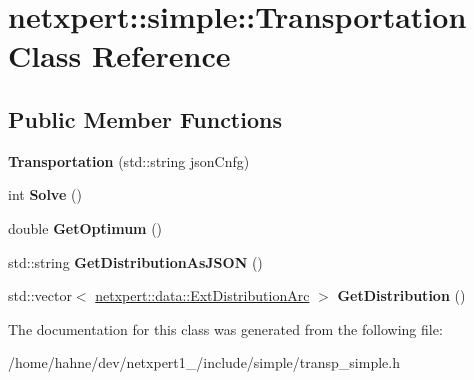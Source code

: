 \hypertarget{classnetxpert_1_1simple_1_1Transportation}{}\section{netxpert\+:\+:simple\+:\+:Transportation Class Reference}
\label{classnetxpert_1_1simple_1_1Transportation}
\subsection*{Public Member Functions}
\begin{DoxyCompactItemize}
\item 
{\bfseries Transportation} (std\+::string json\+Cnfg)\hypertarget{classnetxpert_1_1simple_1_1Transportation_ad20d4fb083bca27030f954e7d38d90b6}{}\label{classnetxpert_1_1simple_1_1Transportation_ad20d4fb083bca27030f954e7d38d90b6}

\item 
int {\bfseries Solve} ()\hypertarget{classnetxpert_1_1simple_1_1Transportation_a6483918f2f94c48cf3157fdcf8656f0a}{}\label{classnetxpert_1_1simple_1_1Transportation_a6483918f2f94c48cf3157fdcf8656f0a}

\item 
double {\bfseries Get\+Optimum} ()\hypertarget{classnetxpert_1_1simple_1_1Transportation_a26f54056cff8ffdc19caa832354cde82}{}\label{classnetxpert_1_1simple_1_1Transportation_a26f54056cff8ffdc19caa832354cde82}

\item 
std\+::string {\bfseries Get\+Distribution\+As\+J\+S\+ON} ()\hypertarget{classnetxpert_1_1simple_1_1Transportation_a8ab271a28fbff93c6a95ed2a0442f619}{}\label{classnetxpert_1_1simple_1_1Transportation_a8ab271a28fbff93c6a95ed2a0442f619}

\item 
std\+::vector$<$ \hyperlink{structnetxpert_1_1data_1_1ExtDistributionArc}{netxpert\+::data\+::\+Ext\+Distribution\+Arc} $>$ {\bfseries Get\+Distribution} ()\hypertarget{classnetxpert_1_1simple_1_1Transportation_a03d1928b72bfab6ddc9514c23888a6b8}{}\label{classnetxpert_1_1simple_1_1Transportation_a03d1928b72bfab6ddc9514c23888a6b8}

\end{DoxyCompactItemize}


The documentation for this class was generated from the following file\+:\begin{DoxyCompactItemize}
\item 
/home/hahne/dev/netxpert1\+\_/include/simple/transp\+\_\+simple.\+h\end{DoxyCompactItemize}

